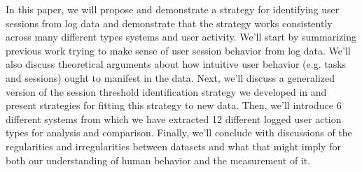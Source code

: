 In this paper, we will propose and demonstrate a strategy for identifying user sessions from log data and demonstrate that the strategy works consistently across many different types systems and user activity.  We'll start by summarizing previous work trying to make sense of user session behavior from log data.  We'll also discuss theoretical arguments about how intuitive user behavior (e.g. tasks and sessions) ought to manifest in the data. Next, we'll discuss a generalized version of the session threshold identification strategy we developed in \cite{geiger13using} and present strategies for fitting this strategy to new data.  Then, we'll introduce 6 different systems from which we have extracted 12 different logged user action types for analysis and comparison. Finally, we'll conclude with discussions of the regularities and irregularities between datasets and what that might imply for both our understanding of human behavior and the measurement of it.
